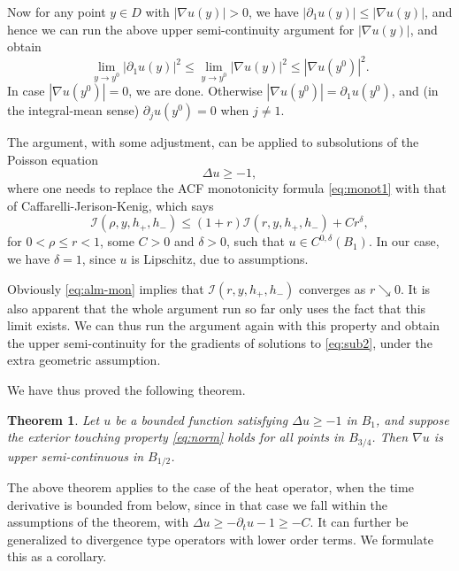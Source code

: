\documentclass[11pt,reqno]{amsart}
\theoremstyle{plain}
\newtheorem{thm}{Theorem}[section]
\theoremstyle{remark}
\numberwithin{equation}{section}
\begin{document}
  Now for any point $y \in D$ with $|\nabla u (y) |>0$, we have $|\partial_1  u(y) |\leq |\nabla u (y) |$, and hence we can run the above  upper semi-continuity argument for $|\nabla u (y) |$, and obtain 
$$
\lim_ {y \to y^0}|\partial_1  u(y) |^2\leq 
\lim_ {y \to y^0}|\nabla u (y) |^2 \leq |\nabla u (y^0) |^2.
$$
In case $|\nabla u (y^0) | = 0$, we are done. 
Otherwise  $|\nabla u (y^0)| = \partial_1 u (y^0)$, and  (in the integral-mean sense) $\partial_j u (y^0)= 0$  when $j\neq 1$.


The argument, with some adjustment,  can be applied to subsolutions of the  Poisson equation  
\begin{equation}\label{eq:sub2}
    \Delta u \geq -1 ,
\end{equation} 
where one needs to replace the ACF monotonicity formula \eqref{eq:monot1}
with that of  Caffarelli-Jerison-Kenig, which says
\begin{equation}\label{eq:alm-mon}
    \mathcal I (\rho ,y,h_+,h_-) \leq (1 + r)\mathcal I (r ,y,h_+,h_-) + C r^\delta ,
\end{equation}
for $0 < \rho \leq r < 1 $, some $C >0$
and $\delta >0 $, such that $u \in C^{0,\delta} (B_1)$. In our case, we have  $\delta =1$, since $u$ is Lipschitz, due to assumptions. 

Obviously \eqref{eq:alm-mon} implies that $\mathcal I (r ,y,h_+,h_-) $ converges  as $r\searrow 0$. It is also apparent that the whole argument run so far only uses the fact that this limit exists. We can thus run the argument again with this property and obtain the upper semi-continuity for the gradients of solutions to \eqref{eq:sub2}, under the extra geometric assumption.

We have thus proved the following theorem.


\begin{thm}\label{thm:subsol1}
    Let $u$ be a bounded  function satisfying  $\Delta u \geq -1$ in $B_1$,  and suppose  the exterior touching property \eqref{eq:norm} holds for all points in $B_{3/4}$.
Then $\nabla u$ is upper semi-continuous in $B_{1/2}$.
\end{thm}



The above theorem applies to the case of the heat operator, when the time derivative is bounded from below, since in that case we fall within the assumptions of the theorem, with $\Delta u \geq -\partial_t u -1 \geq -C$. It can further be generalized to divergence type operators with lower order terms.
We formulate this as a corollary. 
\end{document}
